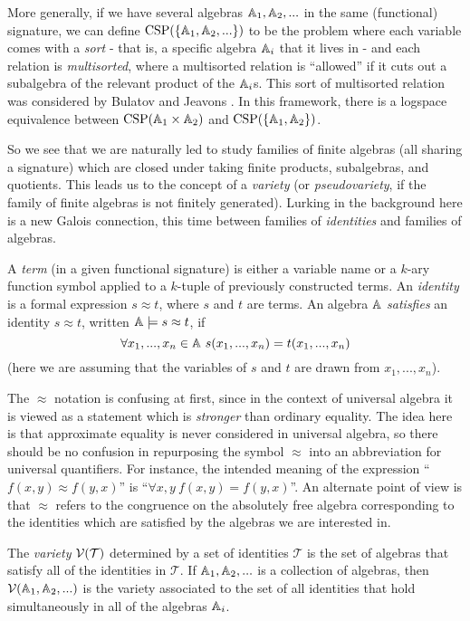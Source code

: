 \documentclass[letterpaper,11pt]{article}
\DeclareMathOperator{\CSP}{CSP}
\begin{document}
More generally, if we have several algebras $\mathbb{A}_1, \mathbb{A}_2, ...$ in the same (functional) signature, we can define $\CSP(\{\bA_1, \bA_2, ...\})$ to be the problem where each variable comes with a \emph{sort} - that is, a specific algebra $\mathbb{A}_i$ that it lives in - and each relation is \emph{multisorted}, where a multisorted relation is ``allowed'' if it cuts out a subalgebra of the relevant product of the $\mathbb{A}_i$s. This sort of multisorted relation was considered by Bulatov and Jeavons \cite{bulatov-jeavons-varieties}. In this framework, there is a logspace equivalence between $\CSP(\bA_1 \times \bA_2)$ and $\CSP(\{\bA_1, \bA_2\})$.

So we see that we are naturally led to study families of finite algebras (all sharing a signature) which are closed under taking finite products, subalgebras, and quotients. This leads us to the concept of a \emph{variety} (or \emph{pseudovariety}, if the family of finite algebras is not finitely generated). Lurking in the background here is a new Galois connection, this time between families of \emph{identities} and families of algebras.

\begin{defn} A \emph{term} (in a given functional signature) is either a variable name or a $k$-ary function symbol applied to a $k$-tuple of previously constructed terms. An \emph{identity} is a formal expression $s \approx t$, where $s$ and $t$ are terms. An algebra $\mathbb{A}$ \emph{satisfies} an identity $s \approx t$, written $\mathbb{A} \models s \approx t$, if
\[
\forall x_1, ..., x_n \in \mathbb{A}\  s(x_1, ..., x_n) = t(x_1, ..., x_n)
\]
(here we are assuming that the variables of $s$ and $t$ are drawn from $x_1, ..., x_n$).
\end{defn}

The $\approx$ notation is confusing at first, since in the context of universal algebra it is viewed as a statement which is \emph{stronger} than ordinary equality. The idea here is that approximate equality is never considered in universal algebra, so there should be no confusion in repurposing the symbol $\approx$ into an abbreviation for universal quantifiers. For instance, the intended meaning of the expression ``$f(x,y) \approx f(y,x)$'' is ``$\forall x,y\ f(x,y) = f(y,x)$''. An alternate point of view is that $\approx$ refers to the congruence on the absolutely free algebra corresponding to the identities which are satisfied by the algebras we are interested in.

\begin{defn} The \emph{variety} $\mathcal{V}(\mathcal{T})$ determined by a set of identities $\mathcal{T}$ is the set of algebras that satisfy all of the identities in $\mathcal{T}$. If $\mathbb{A}_1, \mathbb{A}_2, ...$ is a collection of algebras, then $\mathcal{V}(\mathbb{A}_1, \mathbb{A}_2, ...)$ is the variety associated to the set of all identities that hold simultaneously in all of the algebras $\mathbb{A}_i$.
\end{defn}
\end{document}
